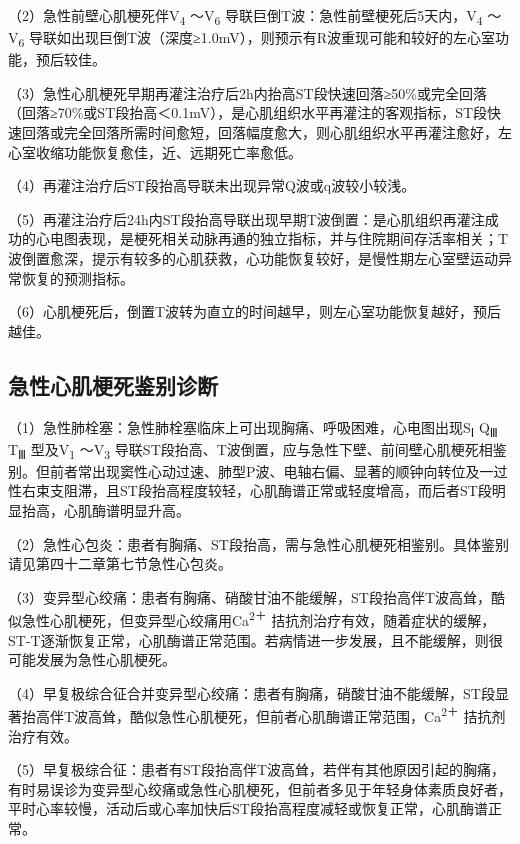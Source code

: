 （2）急性前壁心肌梗死伴V\textsubscript{4} ～V\textsubscript{6}
导联巨倒T波：急性前壁梗死后5天内，V\textsubscript{4}
～V\textsubscript{6}
导联如出现巨倒T波（深度≥1.0mV），则预示有R波重现可能和较好的左心室功能，预后较佳。

（3）急性心肌梗死早期再灌注治疗后2h内抬高ST段快速回落≥50\%或完全回落（回落≥70\%或ST段抬高＜0.1mV），是心肌组织水平再灌注的客观指标，ST段快速回落或完全回落所需时间愈短，回落幅度愈大，则心肌组织水平再灌注愈好，左心室收缩功能恢复愈佳，近、远期死亡率愈低。

（4）再灌注治疗后ST段抬高导联未出现异常Q波或q波较小较浅。

（5）再灌注治疗后24h内ST段抬高导联出现早期T波倒置：是心肌组织再灌注成功的心电图表现，是梗死相关动脉再通的独立指标，并与住院期间存活率相关；T波倒置愈深，提示有较多的心肌获救，心功能恢复较好，是慢性期左心室壁运动异常恢复的预测指标。

（6）心肌梗死后，倒置T波转为直立的时间越早，则左心室功能恢复越好，预后越佳。

\protect\hypertarget{text00052.htmlux5cux23subid634}{}{}

\subsection{急性心肌梗死鉴别诊断}

（1）急性肺栓塞：急性肺栓塞临床上可出现胸痛、呼吸困难，心电图出现S\textsubscript{Ⅰ}
Q\textsubscript{Ⅲ} T\textsubscript{Ⅲ} 型及V\textsubscript{1}
～V\textsubscript{3}
导联ST段抬高、T波倒置，应与急性下壁、前间壁心肌梗死相鉴别。但前者常出现窦性心动过速、肺型P波、电轴右偏、显著的顺钟向转位及一过性右束支阻滞，且ST段抬高程度较轻，心肌酶谱正常或轻度增高，而后者ST段明显抬高，心肌酶谱明显升高。

（2）急性心包炎：患者有胸痛、ST段抬高，需与急性心肌梗死相鉴别。具体鉴别请见第四十二章第七节急性心包炎。

（3）变异型心绞痛：患者有胸痛、硝酸甘油不能缓解，ST段抬高伴T波高耸，酷似急性心肌梗死，但变异型心绞痛用Ca\textsuperscript{2＋}
拮抗剂治疗有效，随着症状的缓解，ST-T逐渐恢复正常，心肌酶谱正常范围。若病情进一步发展，且不能缓解，则很可能发展为急性心肌梗死。

（4）早复极综合征合并变异型心绞痛：患者有胸痛，硝酸甘油不能缓解，ST段显著抬高伴T波高耸，酷似急性心肌梗死，但前者心肌酶谱正常范围，Ca\textsuperscript{2＋}
拮抗剂治疗有效。

（5）早复极综合征：患者有ST段抬高伴T波高耸，若伴有其他原因引起的胸痛，有时易误诊为变异型心绞痛或急性心肌梗死，但前者多见于年轻身体素质良好者，平时心率较慢，活动后或心率加快后ST段抬高程度减轻或恢复正常，心肌酶谱正常。

